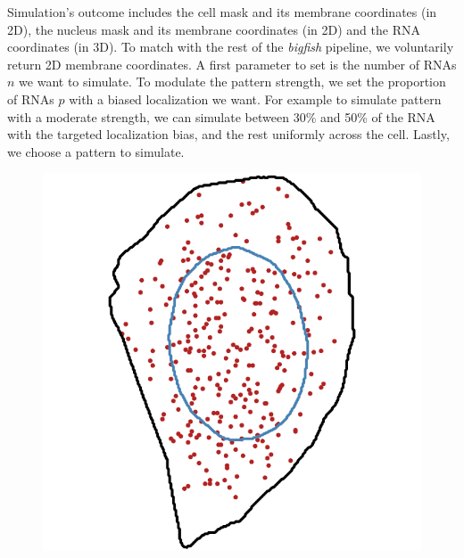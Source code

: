 Simulation's outcome includes the cell mask and its membrane coordinates (in 2D), the nucleus mask and its membrane coordinates (in 2D) and the \ac{RNA} coordinates (in 3D).
To match with the rest of the \emph{bigfish} pipeline, we voluntarily return 2D membrane coordinates.
A first parameter to set is the number of \ac{RNA}s $n$ we want to simulate.
To modulate the pattern strength, we set the proportion of \ac{RNA}s $p$ with a biased localization we want.
For example to simulate pattern with a moderate strength, we can simulate between 30\% and 50\% of the \ac{RNA} with the targeted localization bias, and the rest uniformly across the cell.
Lastly, we choose a pattern to simulate.

\begin{figure}[h]
	\centering
		\includegraphics[width=\linewidth]{figures/chapter4/simulation_perinuclear_10}
	\endminipage\hfill

\end{figure}
